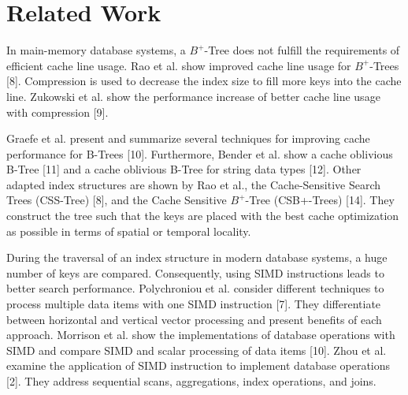 \documentclass[conference]{IEEEtran}
\begin{document}


\section{Related Work}
In main-memory database systems, a $B^+$-Tree does not fulfill the requirements of efficient cache line usage. Rao et al. show improved cache line usage for $B^+$-Trees [8]. Compression is used to decrease the index size to fill more keys into the cache line. Zukowski et al. show the performance increase of better cache line usage with compression [9]. 

Graefe et al. present and summarize several techniques for improving cache performance for B-Trees [10]. Furthermore,
Bender et al. show a cache oblivious B-Tree [11] and
a cache oblivious B-Tree for string data types [12]. Other adapted index structures are shown by Rao et al., the Cache-Sensitive
Search Trees (CSS-Tree) [8], and the Cache Sensitive $B^+$-Tree (CSB+-Trees) [14]. They construct the
tree such that the keys are placed with the best cache optimization as possible in terms of spatial or temporal locality.

During the traversal of an index structure in modern database systems, a huge number of keys are compared. Consequently, using SIMD instructions leads to better search performance. Polychroniou et al. consider different techniques to process multiple data items with one SIMD instruction [7]. They differentiate between horizontal and vertical vector processing and present benefits of each approach. Morrison et al. show the implementations of database operations with SIMD and compare SIMD and scalar processing of data items [10]. Zhou et al. examine the application of SIMD instruction
to implement database operations [2]. They address sequential scans, aggregations, index operations, and joins.
\end{document}
